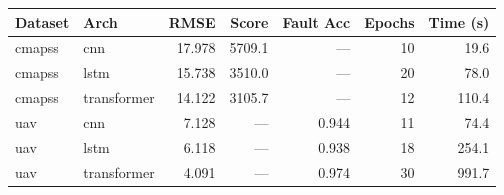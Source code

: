 \begin{tabular}{llrrrrr}
\toprule
Dataset & Arch & RMSE & Score & Fault Acc & Epochs & Time (s) \\
\midrule
cmapss & cnn & 17.978 & 5709.1 & — & 10 & 19.6 \\
cmapss & lstm & 15.738 & 3510.0 & — & 20 & 78.0 \\
cmapss & transformer & 14.122 & 3105.7 & — & 12 & 110.4 \\
uav & cnn & 7.128 & — & 0.944 & 11 & 74.4 \\
uav & lstm & 6.118 & — & 0.938 & 18 & 254.1 \\
uav & transformer & 4.091 & — & 0.974 & 30 & 991.7 \\
\bottomrule
\end{tabular}